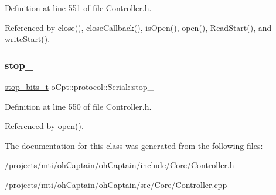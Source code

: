 Definition at line 551 of file Controller.\+h.



Referenced by close(), close\+Callback(), is\+Open(), open(), Read\+Start(), and write\+Start().

\hypertarget{classo_cpt_1_1protocol_1_1_serial_a0905cfeb2f2e21ce6a141e068813f75c}{}\label{classo_cpt_1_1protocol_1_1_serial_a0905cfeb2f2e21ce6a141e068813f75c} 
\subsubsection{\texorpdfstring{stop\+\_\+}{stop\_}}
{\footnotesize\ttfamily \hyperlink{classo_cpt_1_1protocol_1_1_serial_aadc4c803ade35920211e6c6a202a8c1f}{stop\+\_\+bits\+\_\+t} o\+Cpt\+::protocol\+::\+Serial\+::stop\+\_\+\hspace{0.3cm}{\ttfamily [protected]}}



Definition at line 550 of file Controller.\+h.



Referenced by open().



The documentation for this class was generated from the following files\+:\begin{DoxyCompactItemize}
\item 
/projects/mti/oh\+Captain/oh\+Captain/include/\+Core/\hyperlink{_controller_8h}{Controller.\+h}\item 
/projects/mti/oh\+Captain/oh\+Captain/src/\+Core/\hyperlink{_controller_8cpp}{Controller.\+cpp}\end{DoxyCompactItemize}
